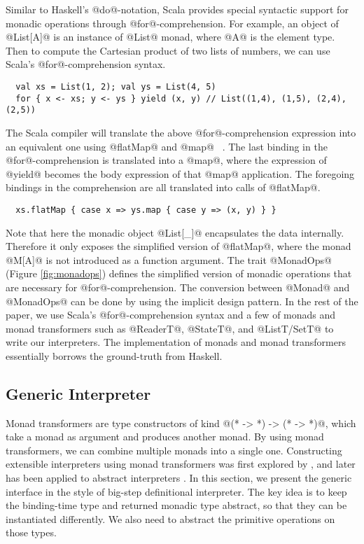 Similar to Haskell's @do@-notation, Scala provides special syntactic support for
monadic operations through @for@-comprehension.
For example, an object of @List[A]@ is an instance of @List@ monad, where @A@ is the element type. 
Then to compute the Cartesian product of two lists of numbers, we can use Scala's
@for@-comprehension syntax.
\begin{lstlisting}
  val xs = List(1, 2); val ys = List(4, 5)
  for { x <- xs; y <- ys } yield (x, y) // List((1,4), (1,5), (2,4), (2,5))
\end{lstlisting}

The Scala compiler will translate the above @for@-comprehension expression into
an equivalent one using @flatMap@ and @map@ ~\cite{scala_spec}. The last binding
in the @for@-comprehension is translated into a @map@, where the expression of
@yield@ becomes the body expression of that @map@ application. The foregoing
bindings in the comprehension are all translated into calls of @flatMap@.
\begin{lstlisting}
  xs.flatMap { case x => ys.map { case y => (x, y) } }
\end{lstlisting}

Note that here the monadic object @List[_]@ encapsulates the data
internally.  Therefore it only exposes the simplified version of
@flatMap@, where the monad @M[A]@ is not introduced as a function
argument. The trait @MonadOps@ (Figure \ref{fig:monadops}) defines the
simplified version of monadic operations that are necessary for
@for@-comprehension. The conversion between @Monad@ and @MonadOps@
can be done by using the implicit design pattern.
In the rest of the paper, we use Scala's @for@-comprehension syntax
and a few of monads and monad transformers such as @ReaderT@,
@StateT@, and @ListT/SetT@ to write our interpreters. The implementation
of monads and monad transformers essentially borrows the ground-truth
from Haskell.

\subsection{Generic Interpreter} \label{generic_if}

Monad transformers are type constructors of kind @(* -> *) -> (* -> *)@, which
take a monad as argument and produces another monad. By using monad
transformers, we can combine multiple monads into a single one. Constructing
extensible interpreters using monad transformers was first explored by
\citet{DBLP:conf/popl/LiangHJ95}, and later has been applied to abstract
interpreters \cite{Sergey:2013:MAI:2491956.2491979,
  DBLP:journals/pacmpl/DaraisLNH17, Darais:2015:GTM:2814270.2814308}.
In this section, we present the generic interface in the style of big-step
definitional interpreter. The key idea is to keep the binding-time type and
returned monadic type abstract, so that they can be instantiated differently.
We also need to abstract the primitive operations on those types.

